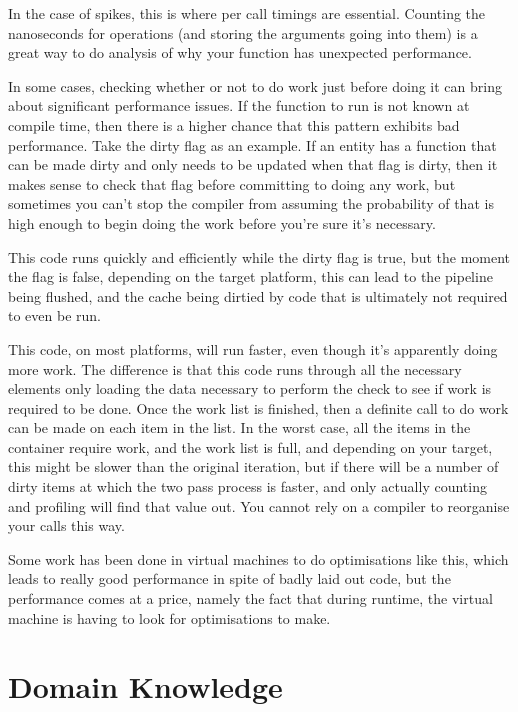 In the case of spikes, this is where per call timings are essential. Counting
the nanoseconds for operations (and storing the arguments going into them) is a
great way to do analysis of why your function has unexpected performance.

In some cases, checking whether or not to do work just before doing it can
bring about significant performance issues. If the function to run is not known
at compile time, then there is a higher chance that this pattern exhibits bad
performance. Take the dirty flag as an example. If an entity has a function
that can be made dirty and only needs to be updated when that flag is dirty,
then it makes sense to check that flag before committing to doing any work, but
sometimes you can't stop the compiler from assuming the probability of that is
high enough to begin doing the work before you're sure it's necessary.


This code runs quickly and efficiently while the dirty flag is true, but the
moment the flag is false, depending on the target platform, this can lead to
the pipeline being flushed, and the cache being dirtied by code that is
ultimately not required to even be run.


This code, on most platforms, will run faster, even though it's apparently
doing more work. The difference is that this code runs through all the
necessary elements only loading the data necessary to perform the check to see
if work is required to be done. Once the work list is finished, then a definite
call to do work can be made on each item in the list. In the worst case, all
the items in the container require work, and the work list is full, and
depending on your target, this might be slower than the original iteration, but
if there will be a number of dirty items at which the two pass process is
faster, and only actually counting and profiling will find that value out. You
cannot rely on a compiler to reorganise your calls this way.

Some work has been done in virtual machines to do optimisations like this,
which leads to really good performance in spite of badly laid out code, but the
performance comes at a price, namely the fact that during runtime, the virtual
machine is having to look for optimisations to make.

\section{Domain Knowledge}

